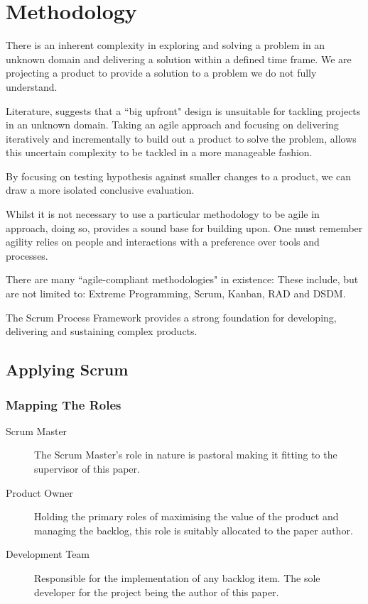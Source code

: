 \chapter{Methodology}

There is an inherent complexity in exploring and solving a problem in an unknown domain and delivering a solution within a defined time frame. We are projecting a product to provide a solution to a problem we do not fully understand. 

Literature, suggests that a ``big upfront" design is unsuitable for tackling projects in an unknown domain. Taking an agile approach and focusing on delivering iteratively and incrementally to build out a product to solve the problem, allows this uncertain complexity to be tackled in a more manageable fashion. 

By focusing on testing hypothesis against smaller changes to a product, we can draw a more isolated conclusive evaluation.

Whilst it is not necessary to use a particular methodology to be agile in approach, doing so, provides a sound base for building upon. One must remember agility relies on people and interactions with a preference over tools and processes. 

There are many ``agile-compliant methodologies" in existence: These include, but are not limited to: Extreme Programming, Scrum, Kanban, RAD and DSDM.


The Scrum Process Framework provides a strong foundation for developing, delivering and sustaining complex products. 


\section{Applying Scrum}

\subsection{Mapping The Roles}

\begin{description}
	\item[Scrum Master] The Scrum Master's role in nature is pastoral making it fitting to the supervisor of this paper.
	
	\item[Product Owner] Holding the primary roles of maximising the value of the product and managing the backlog, this role is suitably allocated to the paper author.
	
	\item[Development Team] Responsible for the implementation of any backlog item. The sole developer for the project being the author of this paper.
\end{description}

